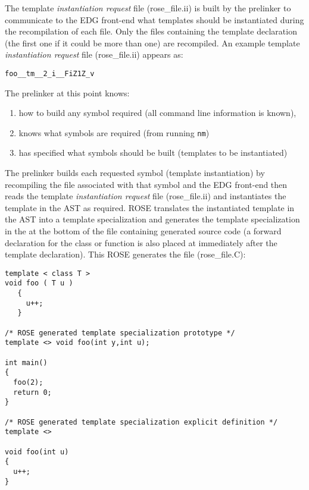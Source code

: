 {The template {\em instantiation request} file (rose\_file.ii) is built by the prelinker 
to communicate to the EDG front-end what templates should be instantiated during the 
recompilation of each file.  Only the files containing the template declaration
(the first one if it could be more than one) are recompiled.  An example template 
{\em instantiation request} file (rose\_file.ii) appears as:

{\indent
{\mySmallFontSize

\begin{verbatim}
foo__tm__2_i__FiZ1Z_v
\end{verbatim}
}}

   The prelinker at this point knows:
\begin{enumerate}
   \item how to build any symbol required (all command line information is known),
   \item knows what symbols are required (from running {\tt nm})
   \item has specified what symbols should be built (templates to be instantiated)
\end{enumerate}

  The prelinker builds each requested symbol (template instantiation) by recompiling
the file associated with that symbol and the EDG front-end then reads the template 
{\em instantiation request} file (rose\_file.ii) and instantiates the template
in the AST as required.  ROSE translates the instantiated template in the AST into
a template specialization and generates the template specialization in the 
at the bottom of the file containing generated source code (a forward declaration
for the class or function is also placed at immediately after the template declaration).
This ROSE generates the file (rose\_file.C):

{\indent
{\mySmallFontSize

\begin{verbatim}
template < class T >
void foo ( T u )
   {
     u++;
   }

/* ROSE generated template specialization prototype */
template <> void foo(int y,int u);

int main()
{
  foo(2);
  return 0;
}

/* ROSE generated template specialization explicit definition */
template <> 

void foo(int u)
{
  u++;
}
\end{verbatim}
}}

}
